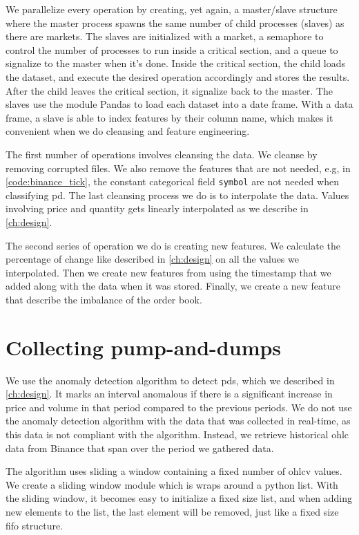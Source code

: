 We parallelize every operation by creating, yet again, a master/slave structure where the master process spawns the same number of child processes (slaves) as there are markets. The slaves are initialized with a market, a semaphore to control the number of processes to run inside a critical section, and a queue to signalize to the master when it's done. Inside the critical section, the child loads the dataset, and execute the desired operation accordingly and stores the results. After the child leaves the critical section, it signalize back to the master.  The slaves use the module Pandas to load each dataset into a date frame. With a data frame, a slave is able to index features by their column name, which makes it convenient when we do cleansing and feature engineering. 

The first number of operations involves cleansing the data. We cleanse by removing corrupted files. We also remove the features that are not needed, e.g, in \autoref{code:binance_tick}, the constant categorical field \texttt{symbol} are not needed when classifying \ac{pd}. The last cleansing process we do is to interpolate the data. Values involving price and quantity gets linearly interpolated as we describe in \autoref{ch:design}.

The second series of operation we do is creating new features. We calculate the percentage of change like described in \autoref{ch:design} on all the values we interpolated. Then we create new features from using the timestamp that we added along with the data when it was stored. Finally, we create a new feature that describe the imbalance of the order book.

\section{Collecting pump-and-dumps}
We use the anomaly detection algorithm to detect \acp{pd}, which we described in \autoref{ch:design}. It marks an interval anomalous if there is a significant increase in price and volume in that period compared to the previous periods. We do not use the anomaly detection algorithm with the data that was collected in real-time, as this data is not compliant with the algorithm. Instead, we retrieve historical \ac{ohlc} data from Binance that span over the period we gathered data.

The algorithm uses sliding a window containing a fixed number of \ac{ohlcv} values. We create a sliding window module which is wraps around a python list. With the sliding window, it becomes easy to initialize a fixed size list, and when adding new elements to the list, the last element will be removed, just like a fixed size \ac{fifo} structure.

